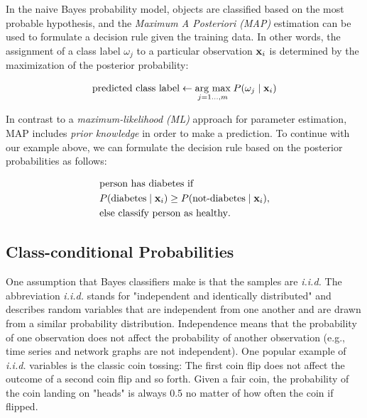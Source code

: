 \documentclass{article}
\begin{document}
In the naive Bayes probability model, objects are classified based on the most probable hypothesis, and the \emph{Maximum A Posteriori (MAP)} estimation can be used to formulate a decision rule given the training data. In other words, the assignment of a class label  $\omega_j$ to a particular observation $\textbf x_i$ is determined by the maximization of the posterior probability:

\begin{equation} \text{predicted class label} \leftarrow \underset{j = 1 ..., m} {\text{arg max}} \; P(\omega_{j} \mid \textbf x_i)   \end{equation}

In contrast to a \emph{maximum-likelihood (ML)} approach for parameter estimation, MAP includes \emph{prior knowledge} in order to make a prediction. To continue with our example above, we can formulate the decision rule based on the posterior probabilities as follows:

\begin{equation} 
\begin{split} 
   & \text{person has diabetes if} \\
   & P(\text{diabetes} \mid \textbf x_i) \ge P(\text{not-diabetes} \mid \textbf x_i), \\
   & \text{else classify person as healthy}.
\end{split}
   \end{equation}




\subsection{Class-conditional Probabilities}
\label{sec:class-conditional_probabilities_1}

One assumption that Bayes classifiers make is that the samples are \emph{i.i.d.}  
The abbreviation \emph{i.i.d.} stands for "independent and identically distributed" and describes random variables that are independent from one another and are drawn from a similar probability distribution. Independence means that the probability of one observation does not affect the probability of another observation (e.g., time series and network graphs are not independent).  One popular example of  \emph{i.i.d.} variables is the classic coin tossing: The first coin flip does not affect the outcome of a second coin flip and so forth. Given a fair coin, the probability of the coin landing on "heads" is always 0.5 no matter of how often the coin if flipped.
\end{document}
